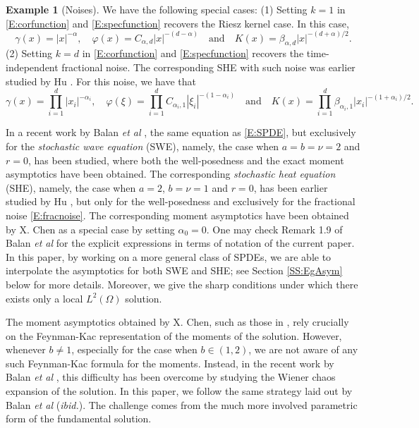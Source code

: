 \documentclass[a4paper,11pt]{article}
\numberwithin{equation}{section}
\numberwithin{equation}{section}
\theoremstyle{plain}
\theoremstyle{definition}
\newtheorem{example}[theorem]{Example}
\begin{document}
\begin{example}[Noises] \label{Eg:NoiseEg}
  We have the following special cases: (1) Setting $k=1$ in \eqref{E:corfunction} and
  \eqref{E:specfunction} recovers the Riesz kernel case. In this case,
  \begin{equation}\label{E:riesznoise}
    \gamma(x)  = |x|^{-\alpha}, \quad
    \varphi(x) = C_{\alpha,d}|x|^{-(d-\alpha)} \quad \text{and} \quad
    K(x)       = \beta_{\alpha,d}|x|^{-(d+\alpha)/2}.
  \end{equation}
  \noindent (2) Setting $k=d$ in \eqref{E:corfunction} and \eqref{E:specfunction} recovers the
  time-independent fractional noise. The corresponding SHE with such noise was earlier studied by Hu
  \cite{Hu01Heat}. For this noise, we have that
  \begin{equation}\label{E:fracnoise}
    \gamma(x)    = \prod_{i=1}^d |x_i|^{-\alpha_i}, \quad
    \varphi(\xi) = \prod_{i=1}^d C_{\alpha_i,1} |\xi_i|^{-(1-\alpha_i)}\quad\text{and}\quad
    K(x)         = \prod_{i=1}^d \beta_{\alpha_i,1}|x_i|^{-(1+\alpha_i)/2}.
  \end{equation}
\end{example}
\bigskip

In a recent work by Balan {\it et al} \cite{BCC21}, the same equation as \eqref{E:SPDE}, but
exclusively for the {\it stochastic wave equation} (SWE), namely, the case when $a=b=\nu=2$ and
$r=0$, has been studied, where both the well-posedness and the exact moment asymptotics have been
obtained. The corresponding {\it stochastic heat equation} (SHE), namely, the case when $a=2$,
$b=\nu=1$ and $r=0$, has been earlier studied by Hu \cite{Hu01Heat}, but only for the well-posedness
and exclusively for the fractional noise \eqref{E:fracnoise}.  The corresponding moment asymptotics
have been obtained by X. Chen \cite{Chen17AIHP} as a special case by setting $\alpha_0=0$. One may
check Remark 1.9 of Balan {\it et al} \cite{BCC21} for the explicit expressions in terms of notation
of the current paper. In this paper, by working on a more general class of SPDEs, we are able to
interpolate the asymptotics for both SWE and SHE; see Section \ref{SS:EgAsym} below for more
details. Moreover, we give the sharp conditions under which there exists only a local $L^2(\Omega)$
solution.

The moment asymptotics obtained by X. Chen, such as those in \cite{Chen17AIHP,Chen19AIHP}, rely
crucially on the Feynman-Kac representation of the moments of the solution. However, whenever $b\ne
1$, especially for the case when $b\in(1,2)$, we are not aware of any such Feynman-Kac formula for
the moments. Instead, in the recent work by Balan {\it et al} \cite{BCC21}, this difficulty has been
overcome by studying the Wiener chaos expansion of the solution. In this paper, we follow the same
strategy laid out by Balan {\it et al} ({\it ibid.}). The challenge comes from the much more
involved parametric form of the fundamental solution.  \bigskip
\end{document}
